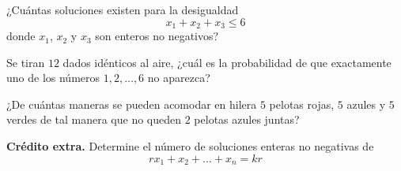 \begin{problema}[3.4 puntos]
¿Cuántas soluciones existen para la desigualdad 
\[x_1+x_2+x_3\leq 6\]
donde $x_1$, $x_2$ y $x_3$ son enteros no negativos?
\end{problema}

\begin{problema}[3.3 puntos]
Se tiran $12$ dados idénticos al aire, ¿cuál es la probabilidad de que exactamente uno de los números $1,2,\ldots,6$ no aparezca?
\end{problema}

\begin{problema}[3.3 puntos]
¿De cuántas maneras se pueden acomodar en hilera $5$ pelotas rojas, $5$ azules y $5$ verdes de tal manera que no queden $2$ pelotas azules juntas?
\end{problema}

\textbf{Crédito extra.} Determine el número de soluciones enteras no negativas de 
\[rx_1+x_2+\ldots+x_n=kr\]